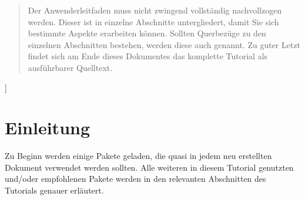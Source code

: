 \documentclass[%
  english,ngerman,%
  cdgeometry=no,DIV=12,automark,%
]{tudscrartcl}
\begin{document}
\begin{abstract}
  Der Anwenderleitfaden muss nicht zwingend vollständig nachvollzogen werden. 
  Dieser ist in einzelne Abschnitte untergliedert, damit Sie sich bestimmte 
  Aspekte erarbeiten können. Sollten Querbezüge zu den einzelnen Abschnitten 
  bestehen, werden diese auch genannt. Zu guter Letzt findet sich am Ende 
  dieses Dokumentes das komplette Tutorial als ausführbarer Quelltext. 
  \end{abstract}
]
\tableofcontents
\listoffigures
\listoftables



\section{Einleitung}
\label{sec:introduction}
Zu Beginn werden einige Pakete geladen, die quasi in jedem neu erstellten 
Dokument verwendet werden sollten. Alle weiteren in diesem Tutorial genutzten 
und/oder empfohlenen Pakete werden in den relevanten Abschnitten des Tutorials 
genauer erläutert. 
\end{document}
